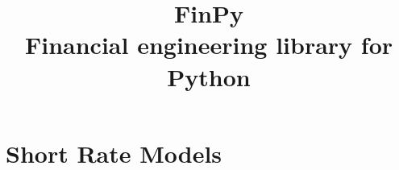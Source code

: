 \documentclass{report}
\title{FinPy \\[0.4cm] \Large Financial engineering library for Python}
\begin{document}
\maketitle

\tableofcontents







\appendix
\chapter{Short Rate Models}





 
\end{document}
